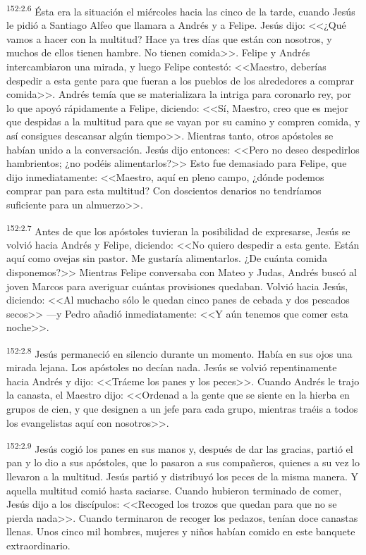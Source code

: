 \par 
\textsuperscript{152:2.6} Ésta era la situación el miércoles hacia las cinco de la tarde, cuando Jesús le pidió a Santiago Alfeo que llamara a Andrés y a Felipe. Jesús dijo: <<¿Qué vamos a hacer con la multitud? Hace ya tres días que están con nosotros, y muchos de ellos tienen hambre. No tienen comida>>. Felipe y Andrés intercambiaron una mirada, y luego Felipe contestó: <<Maestro, deberías despedir a esta gente para que fueran a los pueblos de los alrededores a comprar comida>>. Andrés temía que se materializara la intriga para coronarlo rey, por lo que apoyó rápidamente a Felipe, diciendo: <<Sí, Maestro, creo que es mejor que despidas a la multitud para que se vayan por su camino y compren comida, y así consigues descansar algún tiempo>>. Mientras tanto, otros apóstoles se habían unido a la conversación. Jesús dijo entonces: <<Pero no deseo despedirlos hambrientos; ¿no podéis alimentarlos?>> Esto fue demasiado para Felipe, que dijo inmediatamente: <<Maestro, aquí en pleno campo, ¿dónde podemos comprar pan para esta multitud? Con doscientos denarios no tendríamos suficiente para un almuerzo>>.

\par 
\textsuperscript{152:2.7} Antes de que los apóstoles tuvieran la posibilidad de expresarse, Jesús se volvió hacia Andrés y Felipe, diciendo: <<No quiero despedir a esta gente. Están aquí como ovejas sin pastor. Me gustaría alimentarlos. ¿De cuánta comida disponemos?>> Mientras Felipe conversaba con Mateo y Judas, Andrés buscó al joven Marcos para averiguar cuántas provisiones quedaban. Volvió hacia Jesús, diciendo: <<Al muchacho sólo le quedan cinco panes de cebada y dos pescados secos>> ---y Pedro añadió inmediatamente: <<Y aún tenemos que comer esta noche>>.

\par 
\textsuperscript{152:2.8} Jesús permaneció en silencio durante un momento. Había en sus ojos una mirada lejana. Los apóstoles no decían nada. Jesús se volvió repentinamente hacia Andrés y dijo: <<Tráeme los panes y los peces>>. Cuando Andrés le trajo la canasta, el Maestro dijo: <<Ordenad a la gente que se siente en la hierba en grupos de cien, y que designen a un jefe para cada grupo, mientras traéis a todos los evangelistas aquí con nosotros>>.

\par 
\textsuperscript{152:2.9} Jesús cogió los panes en sus manos y, después de dar las gracias, partió el pan y lo dio a sus apóstoles, que lo pasaron a sus compañeros, quienes a su vez lo llevaron a la multitud. Jesús partió y distribuyó los peces de la misma manera. Y aquella multitud comió hasta saciarse. Cuando hubieron terminado de comer, Jesús dijo a los discípulos: <<Recoged los trozos que quedan para que no se pierda nada>>. Cuando terminaron de recoger los pedazos, tenían doce canastas llenas. Unos cinco mil hombres, mujeres y niños habían comido en este banquete extraordinario.

